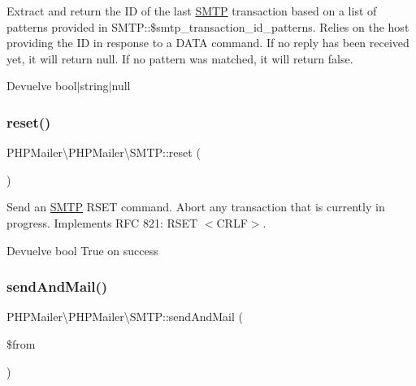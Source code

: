Extract and return the ID of the last \hyperlink{classPHPMailer_1_1PHPMailer_1_1SMTP}{S\+M\+TP} transaction based on a list of patterns provided in S\+M\+T\+P\+::\$smtp\+\_\+transaction\+\_\+id\+\_\+patterns. Relies on the host providing the ID in response to a D\+A\+TA command. If no reply has been received yet, it will return null. If no pattern was matched, it will return false.

\begin{DoxyReturn}{Devuelve}
bool$\vert$string$\vert$null 
\end{DoxyReturn}
\mbox{\label{classPHPMailer_1_1PHPMailer_1_1SMTP_ace903ddfc53a6c998f694cf894266fa4}} 
\subsubsection{\texorpdfstring{reset()}{reset()}}
{\footnotesize\ttfamily P\+H\+P\+Mailer\textbackslash{}\+P\+H\+P\+Mailer\textbackslash{}\+S\+M\+T\+P\+::reset (\begin{DoxyParamCaption}{ }\end{DoxyParamCaption})}

Send an \hyperlink{classPHPMailer_1_1PHPMailer_1_1SMTP}{S\+M\+TP} R\+S\+ET command. Abort any transaction that is currently in progress. Implements R\+FC 821\+: R\+S\+ET $<$\+C\+R\+L\+F$>$.

\begin{DoxyReturn}{Devuelve}
bool True on success 
\end{DoxyReturn}
\mbox{\label{classPHPMailer_1_1PHPMailer_1_1SMTP_aeb1ed13869f950a99eb6a8ad5f6ff668}} 
\subsubsection{\texorpdfstring{send\+And\+Mail()}{sendAndMail()}}
{\footnotesize\ttfamily P\+H\+P\+Mailer\textbackslash{}\+P\+H\+P\+Mailer\textbackslash{}\+S\+M\+T\+P\+::send\+And\+Mail (\begin{DoxyParamCaption}\item[{}]{\$from }\end{DoxyParamCaption})}

